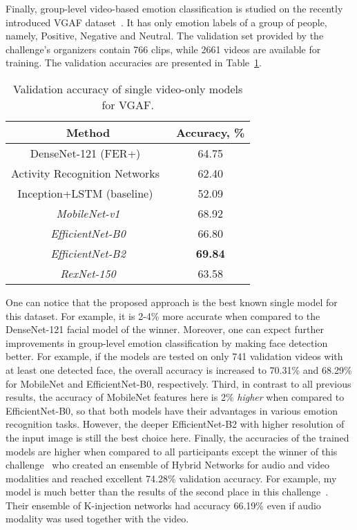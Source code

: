 \documentclass[runningheads]{llncs}
\begin{document}
Finally, group-level video-based emotion classification is studied on the recently introduced VGAF dataset~\cite{sharma2019automatic}. It has only  emotion labels of a group of people, namely, Positive, Negative and Neutral. The validation set provided by the challenge's organizers contain 766 clips, while 2661 videos are available for training. The validation accuracies are presented in Table~\ref{tab4}. 

\begin{table}[t]
\caption{Validation accuracy of single video-only models for VGAF.}\label{tab4}
\centering
\begin{tabular}{|c|c|}
\hline
Method & Accuracy, \%\\
\hline
DenseNet-121 (FER+)~\cite{liu2020group} & 64.75\\
Activity Recognition Networks~\cite{pinto2020audiovisual} & 62.40\\
Inception+LSTM (baseline)~\cite{sharma2019automatic} & 52.09\\
\hline
\it MobileNet-v1 & 68.92\\ \it EfficientNet-B0 & 66.80\\ \it EfficientNet-B2 & \bf 69.84\\ 
\it RexNet-150 & 63.58\\ \hline
\end{tabular}
\end{table}

One can notice that the proposed approach is the best known single model for this dataset. For example, it is 2-4\% more accurate when compared to the DenseNet-121 facial model of the winner. Moreover, one can expect further improvements in group-level emotion classification by making face detection better. For example, if the models are tested on only 741 validation videos with at least one detected face, the overall accuracy is increased to 70.31\% and 68.29\% for MobileNet and EfficientNet-B0, respectively. Third, in contrast to all previous results, the accuracy of MobileNet features here is 2\% \textit{higher} when compared to EfficientNet-B0, so that both models have their advantages in various emotion recognition tasks. However, the deeper EfficientNet-B2 with higher resolution of the input image is still the best choice here. Finally, the accuracies of the trained models are higher when compared to all participants except the winner of this challenge~\cite{liu2020group} who created an ensemble of Hybrid Networks for audio and video modalities and reached excellent 74.28\% validation accuracy. For example, my model is much better than the results of the second place in this challenge~\cite{wang2020implicit}. Their ensemble of K-injection networks had accuracy 66.19\% even if audio modality was used together with the video.
 
\end{document}

